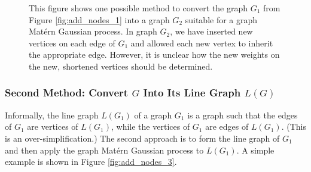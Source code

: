 \begin{figure}
    \begin{center}
    \end{center}
    \caption{This figure shows one possible method to convert the graph $G_1$ from Figure \ref{fig:add_nodes_1} into a graph $G_2$ suitable for a graph Mat\'{e}rn Gaussian process. In graph $G_2$, we have inserted new vertices on each edge of $G_1$ and allowed each new vertex to inherit the appropriate edge. However, it is unclear how the new weights on the new, shortened vertices should be determined.}
    \label{fig:add_nodes_2}
\end{figure}

\subsubsection{Second Method: Convert \texorpdfstring{$G$}{G} Into Its Line Graph \texorpdfstring{$L(G)$}{LofG}}

Informally, the line graph $L(G_1)$ of a graph $G_1$ is a graph such that the edges of $G_1$ are vertices of $L(G_1)$, while the vertices of $G_1$ are edges of $L(G_1)$. (This is an over-simplification.) The second approach is to form the line graph of $G_1$ and then apply the graph Mat\'{e}rn Gaussian process to $L(G_1)$. A simple example is shown in Figure \ref{fig:add_nodes_3}.

